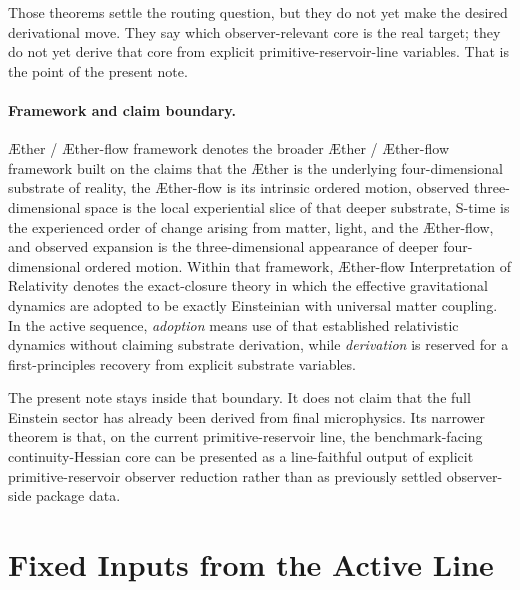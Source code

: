 \documentclass[11pt]{article}
\newcommand{\Aether}{\AE{}ther}
\newcommand{\Aflow}{\AE{}ther-flow}
\newcommand{\TheoryName}{\Aflow{} Interpretation of Relativity}
\newcommand{\TheoryProgram}{\Aether{} / \Aflow{} framework}
\begin{document}
Those theorems settle the routing question, but they do not yet make the desired derivational move. They say which observer-relevant core is the real target; they do not yet derive that core from explicit primitive-reservoir-line variables. That is the point of the present note.

\paragraph{Framework and claim boundary.}
\TheoryProgram{} denotes the broader \Aether{} / \Aflow{} framework built on the claims that the \Aether{} is the underlying four-dimensional substrate of reality, the \Aflow{} is its intrinsic ordered motion, observed three-dimensional space is the local experiential slice of that deeper substrate, S-time is the experienced order of change arising from matter, light, and the \Aflow{}, and observed expansion is the three-dimensional appearance of deeper four-dimensional ordered motion. Within that framework, \TheoryName{} denotes the exact-closure theory in which the effective gravitational dynamics are adopted to be exactly Einsteinian with universal matter coupling. In the active sequence, \emph{adoption} means use of that established relativistic dynamics without claiming substrate derivation, while \emph{derivation} is reserved for a first-principles recovery from explicit substrate variables.

The present note stays inside that boundary. It does not claim that the full Einstein sector has already been derived from final microphysics. Its narrower theorem is that, on the current primitive-reservoir line, the benchmark-facing continuity-Hessian core can be presented as a line-faithful output of explicit primitive-reservoir observer reduction rather than as previously settled observer-side package data.

\section{Fixed Inputs from the Active Line}
\end{document}
